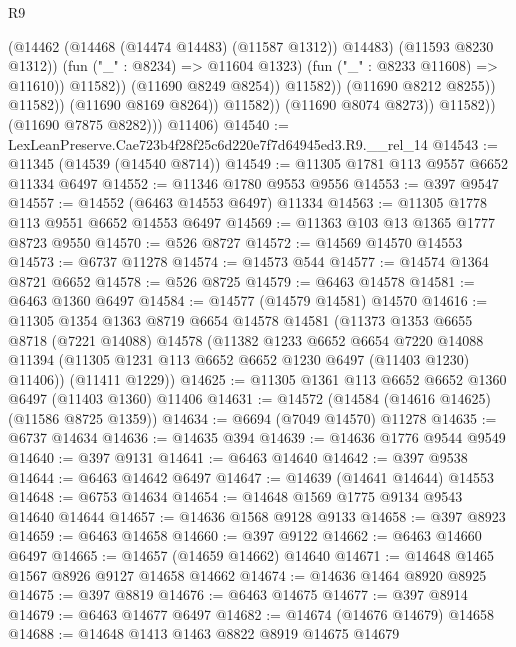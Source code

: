 \begin{lexlean}{R9}
\begin{coremodule}
                                          (@14462 (@14468 (@14474 @14483) (@11587 @1312)) @14483)
                                          (@11593 @8230 @1312))
                                        (fun ("_" : @8234) => @11604 @1323)
                                        (fun ("_" : @8233 @11608) => @11610))
                                      @11582))
                                  (@11690 @8249 @8254))
                                @11582))
                            (@11690 @8212 @8255))
                          @11582))
                      (@11690 @8169 @8264))
                    @11582))
                (@11690 @8074 @8273))
              @11582))
          (@11690 @7875 @8282)))
      @11406)
@14540 := LexLeanPreserve.Cae723b4f28f25c6d220e7f7d64945ed3.R9.__rel_14
@14543 := @11345 (@14539 (@14540 @8714))
@14549 := @11305 @1781 @113 @9557 @6652 @11334 @6497
@14552 := @11346 @1780 @9553 @9556
@14553 := @397 @9547
@14557 := @14552 (@6463 @14553 @6497) @11334
@14563 := @11305 @1778 @113 @9551 @6652 @14553 @6497
@14569 := @11363 @103 @13 @1365 @1777 @8723 @9550
@14570 := @526 @8727
@14572 := @14569 @14570 @14553
@14573 := @6737 @11278
@14574 := @14573 @544
@14577 := @14574 @1364 @8721 @6652
@14578 := @526 @8725
@14579 := @6463 @14578
@14581 := @6463 @1360 @6497
@14584 := @14577 (@14579 @14581) @14570
@14616 := @11305
    @1354
    @1363
    @8719
    @6654
    @14578
    @14581
    (@11373
      @1353
      @6655
      @8718
      (@7221 @14088)
      @14578
      (@11382
        @1233
        @6652
        @6654
        @7220
        @14088
        @11394
        (@11305 @1231 @113 @6652 @6652 @1230 @6497 (@11403 @1230) @11406))
      (@11411 @1229))
@14625 := @11305 @1361 @113 @6652 @6652 @1360 @6497 (@11403 @1360) @11406
@14631 := @14572 (@14584 (@14616 @14625) (@11586 @8725 @1359))
@14634 := @6694 (@7049 @14570) @11278
@14635 := @6737 @14634
@14636 := @14635 @394
@14639 := @14636 @1776 @9544 @9549
@14640 := @397 @9131
@14641 := @6463 @14640
@14642 := @397 @9538
@14644 := @6463 @14642 @6497
@14647 := @14639 (@14641 @14644) @14553
@14648 := @6753 @14634
@14654 := @14648 @1569 @1775 @9134 @9543 @14640 @14644
@14657 := @14636 @1568 @9128 @9133
@14658 := @397 @8923
@14659 := @6463 @14658
@14660 := @397 @9122
@14662 := @6463 @14660 @6497
@14665 := @14657 (@14659 @14662) @14640
@14671 := @14648 @1465 @1567 @8926 @9127 @14658 @14662
@14674 := @14636 @1464 @8920 @8925
@14675 := @397 @8819
@14676 := @6463 @14675
@14677 := @397 @8914
@14679 := @6463 @14677 @6497
@14682 := @14674 (@14676 @14679) @14658
@14688 := @14648 @1413 @1463 @8822 @8919 @14675 @14679

\end{coremodule}
\end{lexlean}
